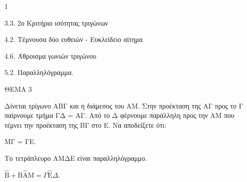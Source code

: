 \begin{ylh}{1}
    \item 3.3. 2ο Κριτήριο ισότητας τριγώνων
    \item 4.2. Τέμνουσα δύο ευθειών - Ευκλείδειο αίτημα
    \item 4.6. Άθροισμα γωνιών τριγώνου
    \item 5.2. Παραλληλόγραμμα.
\end{ylh}

ΘΕΜΑ 3

Δίνεται τρίγωνο ΑΒΓ και η διάμεσος του ΑΜ. Στην προέκταση της ΑΓ προς το Γ παίρνουμε τμήμα ΓΔ = ΑΓ. Από το Δ φέρνουμε παράλληλη προς την ΑΜ που τέμνει την προέκταση της ΒΓ στο Ε. Να αποδείξετε ότι:

\begin{alist}
\item ΜΓ = ΓΕ. 

\item Το τετράπλευρο ΑΜΔΕ είναι παραλληλόγραμμο. 

\item $\widehat{\text{B}} + \text{B}\widehat{\text{A}}\text{M} = \Gamma\widehat{\text{E}}\Delta$. 
\end{alist}
